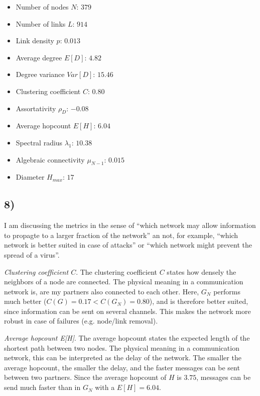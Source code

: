 \documentclass{article}
\begin{document}
\begin{itemize}
\item Number of nodes $N$: $379$
\item Number of links $L$: $914$
\item Link density $p$: $0.013$
\item Average degree $E[D]$: $4.82$
\item Degree variance $Var[D]$: $15.46$
\item Clustering coefficient $C$: $0.80$
\item Assortativity $\rho_D$: $-0.08$
\item Average hopcount $E[H]$: $6.04$
\item Spectral radius $\lambda_1$: $10.38$
\item Algebraic connectivity $\mu_{N-1}$: $0.015$
\item Diameter $H_{max}$: $17$
\end{itemize}

\subsection*{8)}

I am discussing the metrics in the sense of ``which network may allow
information to propagte to a larger fraction of the network'' an not,
for example, ``which network is better suited in case of attacks'' or
``which network might prevent the spread of a virus''.
\vspace*{0.5em}

\noindent\emph{Clustering coefficient $C$}. The clustering coefficient $C$
states how densely the neighbors of a node are connected. The physical
meaning in a communication network is, are my partners also connected
to each other. Here, $G_N$ performs much better
($C(G) = 0.17 < C(G_N) = 0.80$), and is therefore better suited, since
information can be sent on several channels. This makes the network
more robust in case of failures (e.g. node/link removal).

\vspace*{0.5em}
\noindent\emph{Average hopcount E[H]}. The average hopcount states the expected
length of the shortest path between two nodes. The physical meaning in
a communication network, this can be interpreted as the delay of the
network. The smaller the average hopcount, the smaller the delay, and
the faster messages can be sent between two partners. Since the
average hopcount of $H$ is $3.75$, messages can be send much faster
than in $G_N$ with a $E[H] = 6.04$.
\end{document}
